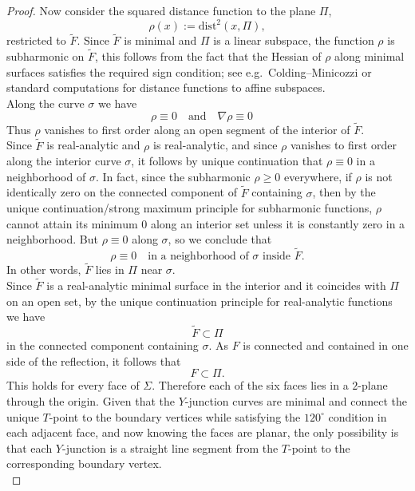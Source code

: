 \documentclass[11pt]{amsart}
\numberwithin{equation}{section}
\theoremstyle{theorem}
\theoremstyle{definition}
\numberwithin{equation}{section}
\begin{document}
\begin{proof}
Now consider the squared distance function to the plane \(\Pi\),
\[
\rho(x) := \mathrm{dist}^2(x, \Pi),
\]
restricted to \(\widetilde{F}\). Since \(\widetilde{F}\) is minimal and \(\Pi\) is a linear subspace, the function \(\rho\) is subharmonic on \(\widetilde{F}\), this follows from the fact that the Hessian of \(\rho\) along minimal surfaces satisfies the required sign condition; see e.g.\ Colding--Minicozzi \cite{colding2011course} or standard computations for distance functions to affine subspaces.\\
Along the curve \(\sigma\) %
we have
\[
\rho \equiv 0 \quad \text{and} \quad \nabla \rho \equiv 0 \quad %
\]
Thus \(\rho\) vanishes to first order along an open segment of the interior of \(\widetilde{F}\).\\
Since \(\widetilde{F}\) is real-analytic and $\rho$ is real-analytic, and since $\rho$ vanishes to first order along the interior curve $\sigma$, it follows by unique continuation that $\rho \equiv 0$ in a neighborhood of $\sigma$.
In fact, since the subharmonic \(\rho \geq 0\) everywhere, if \(\rho\) is not identically zero on the connected component of \(\widetilde{F}\) containing \(\sigma\), then by the unique continuation/strong maximum principle for subharmonic functions, %
\(\rho\) cannot attain its minimum $0$ along an interior set unless it is constantly zero in a neighborhood. But \(\rho \equiv 0\) along \(\sigma\), so we conclude that
\[
\rho \equiv 0 \quad \text{in a neighborhood of } \sigma \text{ inside } \widetilde{F}.
\]
In other words, \(\widetilde{F}\) lies in \(\Pi\) near \(\sigma\).\\
Since \(\widetilde{F}\) is a real-analytic minimal surface in the interior and it coincides with \(\Pi\) on an open set, by the unique continuation principle for real-analytic functions %
we have
\[
\widetilde{F} \subset \Pi
\]
in the connected component containing \(\sigma\). As \(F\) is connected and contained in one side of the reflection, it follows that
\[
F \subset \Pi.
\]
This holds for every face of \(\Sigma\). Therefore each of the six faces lies in a $2$-plane through the origin. Given that the $Y$-junction curves are minimal and connect the unique $T$-point to the boundary vertices while satisfying the $120^\circ$ condition in each adjacent face, and now knowing the faces are planar, the only possibility is that each $Y$-junction is a straight line segment from the $T$-point to the corresponding boundary vertex.\\ %

\end{proof}
\end{document}
